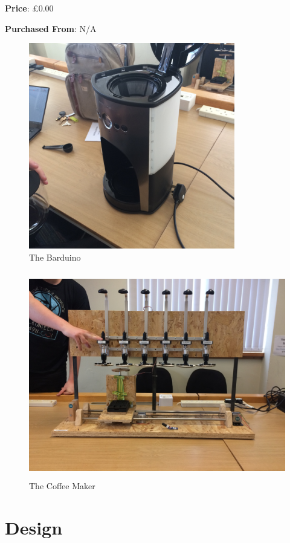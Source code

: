 \documentclass[12pt, a4paper]{article}
\begin{document}
\textbf{Price}: £0.00

\textbf{Purchased From}: N/A
\newpage

\begin{figure}[H]
    \centering    
    \includegraphics[height=9cm, angle=270]{images/coffee}
    \caption{The Barduino}
\end{figure}

\begin{figure}[H]
    \centering    
    \includegraphics[height=9cm]{images/barduino}
    \caption{The Coffee Maker}
\end{figure}

\newpage


\section{Design}
\end{document}
